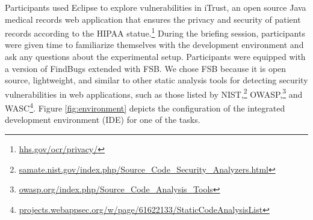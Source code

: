 \documentclass[conference]{IEEEtran}
\begin{document}
Participants used Eclipse to explore vulnerabilities in iTrust, an open source Java medical records web application that ensures the privacy and security of patient records according to the HIPAA statue.\footnote{\url{hhs.gov/ocr/privacy/}} 
During the briefing session, participants were given time to familiarize themselves with the development environment and ask any questions about the experimental setup.
Participants were equipped with a version of FindBugs extended with FSB.
We chose FSB because it is open source, lightweight, and similar to other static analysis tools for detecting security vulnerabilities in web applications, such as those listed by NIST,\footnote{\url{samate.nist.gov/index.php/Source_Code_Security_Analyzers.html}} OWASP,\footnote{\url{owasp.org/index.php/Source_Code_Analysis_Tools}} and WASC\footnote{\url{projects.webappsec.org/w/page/61622133/StaticCodeAnalysisList}}.
Figure \ref{fig:environment} depicts the configuration of the integrated development environment (IDE) for one of the tasks.
\end{document}
